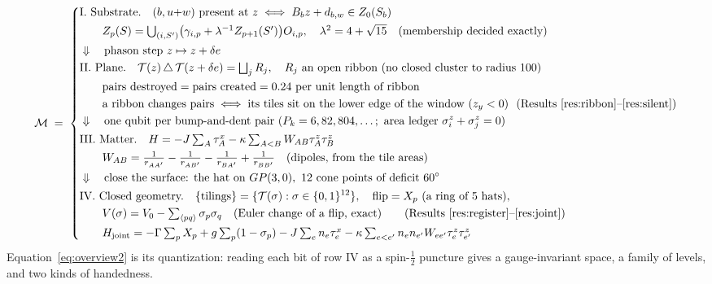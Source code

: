 \documentclass[11pt]{article}
\theoremstyle{definition}
\begin{document}
{\footnotesize
\begin{equation}\label{eq:overview}
\mathcal{M}
\;=\; \left\{ \begin{aligned}
&\text{I. Substrate.}\quad (b,u{+}w)\ \text{present at } z \iff B_bz+d_{b,w}\in Z_0(S_b) \\
&\qquad Z_p(S)=\textstyle\bigcup_{(i,S')}\bigl(\gamma_{i,p}+\lambda^{-1}Z_{p+1}(S')\bigr)O_{i,p},\quad \lambda^2=4+\sqrt{15}\quad \text{(membership decided exactly)}\\
&\Downarrow\quad \text{phason step } z\mapsto z+\delta e \\
&\text{II. Plane.}\quad \mathcal{T}(z)\,\triangle\,\mathcal{T}(z+\delta e)=\textstyle\bigsqcup_j R_j,\quad R_j \text{ an open ribbon (no closed cluster to radius } 100) \\
&\qquad \text{pairs destroyed} = \text{pairs created} = 0.24 \text{ per unit length of ribbon} \\
&\qquad \text{a ribbon changes pairs} \iff \text{its tiles sit on the lower edge of the window } (z_y<0)\ \  \text{(Results~\ref{res:ribbon}--\ref{res:silent})}\\
&\Downarrow\quad \text{one qubit per bump-and-dent pair } (P_k=6,82,804,\dots;\ \text{area ledger } \sigma^z_i+\sigma^z_j=0) \\
&\text{III. Matter.}\quad H=-J\textstyle\sum_A\tau^x_A-\kappa\sum_{A<B}W_{AB}\tau^z_A\tau^z_B \\
&\qquad W_{AB}=\tfrac1{r_{AA'}}-\tfrac1{r_{AB'}}-\tfrac1{r_{BA'}}+\tfrac1{r_{BB'}}\quad \text{(dipoles, from the tile areas)}\\
&\Downarrow\quad \text{close the surface: the hat on } GP(3,0),\ 12 \text{ cone points of deficit } 60^\circ \\
&\text{IV. Closed geometry.}\quad \{\text{tilings}\}=\{\mathcal{T}(\sigma):\sigma\in\{0,1\}^{12}\},\quad \text{flip}=X_p\ (\text{a ring of 5 hats}),\\
&\qquad V(\sigma)=V_0-\textstyle\sum_{\langle pq\rangle}\sigma_p\sigma_q\quad \text{(Euler change of a flip, exact)}\qquad \text{(Results~\ref{res:register}--\ref{res:joint})} \\
&\qquad H_{\mathrm{joint}}=-\Gamma\textstyle\sum_pX_p+g\sum_p(1-\sigma_p)-J\sum_e n_e\tau^x_e-\kappa\sum_{e<e'}n_en_{e'}W_{ee'}\tau^z_e\tau^z_{e'}\\
\end{aligned} \right.
\end{equation}
}
Equation~\eqref{eq:overview2} is its quantization: reading each bit of row IV as a spin-$\tfrac12$ puncture gives a gauge-invariant space, a family of levels, and two kinds of handedness.
\end{document}
